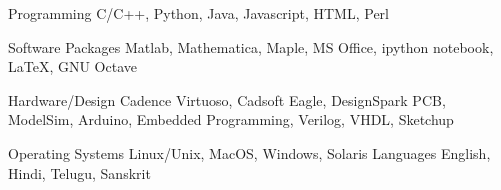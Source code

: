 % 


\begin{cvskills}

  \cvskill
    {Programming} %
    {C/C++, Python, Java, Javascript, HTML, Perl} %

  \cvskill
    {Software Packages} %
    {Matlab, Mathematica, Maple, MS Office, ipython notebook, LaTeX, GNU Octave} %

  \cvskill
    {Hardware/Design} %
    {Cadence Virtuoso, Cadsoft Eagle, DesignSpark PCB, ModelSim, Arduino, Embedded Programming, Verilog, VHDL, Sketchup} %

\cvskill
{Operating Systems} %
{Linux/Unix, MacOS, Windows, Solaris} %
  \cvskill
    {Languages} %
    {English, Hindi, Telugu, Sanskrit} %

    
\end{cvskills}
% 
% 

